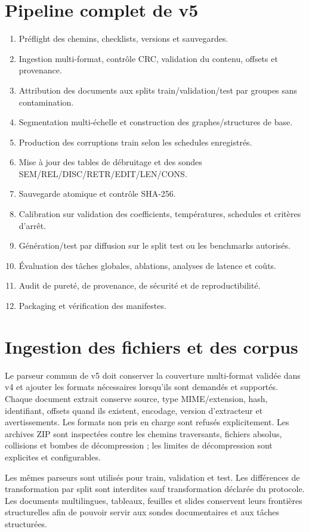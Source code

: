 \documentclass[11pt,a4paper,oneside]{report}
\begin{document}
\chapter{Pipeline complet de v5}
\begin{enumerate}[label=\arabic*.]
\item Préflight des chemins, checklists, versions et sauvegardes.
\item Ingestion multi-format, contrôle CRC, validation du contenu, offsets et provenance.
\item Attribution des documents aux splits train/validation/test par groupes sans contamination.
\item Segmentation multi-échelle et construction des graphes/structures de base.
\item Production des corruptions train selon les schedules enregistrés.
\item Mise à jour des tables de débruitage et des sondes SEM/REL/DISC/RETR/EDIT/LEN/CONS.
\item Sauvegarde atomique et contrôle SHA-256.
\item Calibration sur validation des coefficients, températures, schedules et critères d'arrêt.
\item Génération/test par diffusion sur le split test ou les benchmarks autorisés.
\item Évaluation des tâches globales, ablations, analyses de latence et coûts.
\item Audit de pureté, de provenance, de sécurité et de reproductibilité.
\item Packaging et vérification des manifestes.
\end{enumerate}

\chapter{Ingestion des fichiers et des corpus}
Le parseur commun de v5 doit conserver la couverture multi-format validée dans v4 et ajouter les formats nécessaires lorsqu'ils sont demandés et supportés. Chaque document extrait conserve source, type MIME/extension, hash, identifiant, offsets quand ils existent, encodage, version d'extracteur et avertissements. Les formats non pris en charge sont refusés explicitement. Les archives ZIP sont inspectées contre les chemins traversants, fichiers absolus, collisions et bombes de décompression ; les limites de décompression sont explicites et configurables.

Les mêmes parseurs sont utilisés pour train, validation et test. Les différences de transformation par split sont interdites sauf transformation déclarée du protocole. Les documents multilingues, tableaux, feuilles et slides conservent leurs frontières structurelles afin de pouvoir servir aux sondes documentaires et aux tâches structurées.
\end{document}
